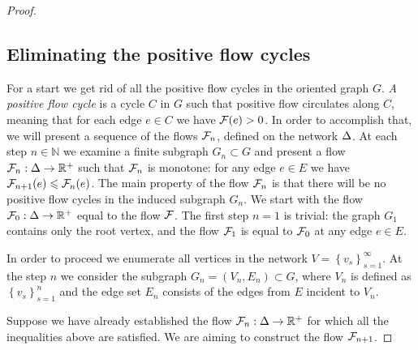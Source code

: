 \documentclass[12pt,oneside,a4paper]{amsart}
\begin{document}
\begin{proof}
      \subsection{Eliminating the positive flow cycles}
        For a start we get rid of all the positive flow cycles in the oriented graph $G$.
        \emph{A positive flow cycle} is a cycle $C$ in $G$ such that positive flow circulates along $C$,
          meaning that for each edge $e \in C$ we have $\mathcal{F}(e) > 0$.
        In order to accomplish that, we will present a sequence of the flows $\mathcal{F}_{n}$, defined on the network $\Delta$.
        At each step $n \in \mathbb{N}$ we examine a finite subgraph $G_n \subset G$ and present a flow $\mathcal{F}_{n}: \Delta \to \mathbb{R}^{+}$
          such that $\mathcal{F}_{n}$ is monotone: for any edge $e \in E$ we have $\mathcal{F}_{n+1}(e) \leqslant \mathcal{F}_{n}(e)$.
        The main property of the flow $\mathcal{F}_{n}$ is that there will be no positive flow cycles in the induced subgraph
        $G_n$.
        We start with the flow $\mathcal{F}_{0}:\Delta \to \mathbb{R}^+$ equal to the flow $\mathcal{F}$.
        The first step $n = 1$ is trivial: the graph $G_1$ contains only the root vertex, and
          the flow $\mathcal{F}_{1}$ is equal to $\mathcal{F}_{0}$ at any edge $e \in E$.

        In order to proceed we enumerate all vertices in the network $V = \left\{v_s\right\}_{s=1}^\infty$.
        At the step $n$ we consider the subgraph $G_n = (V_n, E_n) \subset G$, where $V_n$ is defined as $\left\{v_s\right\}_{s=1}^n$
          and the edge set $E_n$ consists of the edges from $E$ incident to $V_n$.

        Suppose we have already established the flow $\mathcal{F}_{n}: \Delta \to \mathbb{R}^{+}$ for which
          all the inequalities above are satisfied.
        We are aiming to construct the flow $\mathcal{F}_{n+1}$.


\end{proof}
\end{document}
